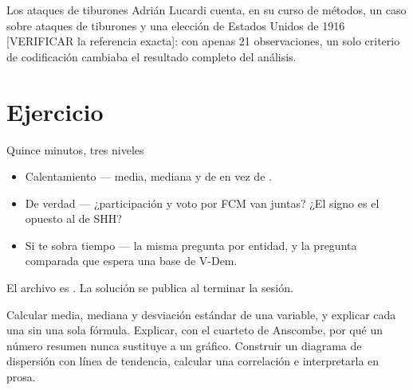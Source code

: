 \begin{frame}{Los ataques de tiburones}
  \vspace{0.3em}
  Adrián Lucardi cuenta, en su curso de métodos, un caso sobre ataques de
  tiburones y una elección de Estados Unidos de 1916
  {\footnotesize\color{grisTenue}[VERIFICAR la referencia exacta]}: con
  apenas 21 observaciones, un solo criterio de codificación cambiaba el
  resultado completo del análisis.

  \vspace{1.0em}
\end{frame}

\section{Ejercicio}

\begin{frame}{Quince minutos, tres niveles}
  \vspace{0.4em}
  \begin{itemize}\setlength{\itemsep}{1.0em}
    \item \ac{Calentamiento} — media, mediana y  de
           en vez de .
    \item \ac{De verdad} — ¿participación y voto por FCM van juntas? ¿El
          signo es el opuesto al de SHH?
    \item \ac{Si te sobra tiempo} — la misma pregunta por entidad, y la
          pregunta comparada que espera una base de V-Dem.
  \end{itemize}

  \vspace{1.2em}
  {\small\color{grisTenue}El archivo es . La
  solución se publica al terminar la sesión.}
\end{frame}

\yasabemos
  {Calcular media, mediana y desviación estándar de una variable, y explicar cada una sin una sola fórmula.}
  {Explicar, con el cuarteto de Anscombe, por qué un número resumen nunca sustituye a un gráfico.}
  {Construir un diagrama de dispersión con línea de tendencia, calcular una correlación e interpretarla en prosa.}



